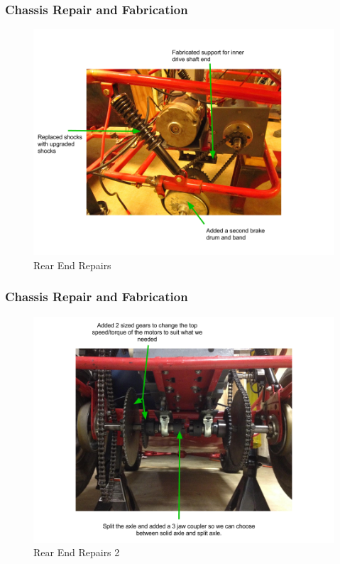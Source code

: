 \documentclass{beamer}
\begin{document}
\begin{frame}
	\frametitle{Chassis Repair and Fabrication}
	\begin{figure}
		\centering 
		\includegraphics[scale=.3]{figures/png/SeniorDesignPresentation-3.png}
		\caption{Rear End Repairs} 
	\end{figure}	
\end{frame}
\begin{frame}
	\frametitle{Chassis Repair and Fabrication}
	\begin{figure}
		\centering 
		\includegraphics[scale=.27]{figures/png/SeniorDesignPresentation-4.png}
		\caption{Rear End Repairs 2} 
	\end{figure}	
\end{frame}
\end{document}
